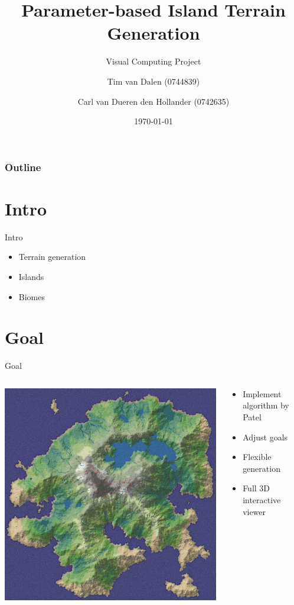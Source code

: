 \documentclass[english,aspectratio=43]{beamer}
\title{Parameter-based Island Terrain Generation}
\subtitle{Visual Computing Project}
\author[van Dalen, van Dueren den Hollander]{
	Tim van Dalen (0744839)\\
	\and
	Carl van Dueren den Hollander (0742635)
}
\institute[TU/e]
{
    WIS\\
	Eindhoven University of Technology
}
\date{\today}
\begin{document}
	\begin{frame}
		\titlepage
	\end{frame}

	\begin{frame}
		\frametitle{Outline}
		\tableofcontents
	\end{frame}

	\section{Intro}
	\begin{frame}{Intro}
		\begin{itemize}
			\item Terrain generation
			\item Islands
			\item Biomes
		\end{itemize}
	\end{frame}

	\section{Goal}
	\begin{frame}{Goal}
		\begin{columns}[T]
			\begin{column}{.5\textwidth}
				\includegraphics[width=\linewidth]{goal}
			\end{column}
			\begin{column}{.5\textwidth}
				\begin{itemize}
					\item Implement algorithm by Patel
					\item Adjust goals
					\item Flexible generation
					\item Full 3D interactive viewer
				\end{itemize}
			\end{column}
		\end{columns}
	\end{frame}
\end{document}
